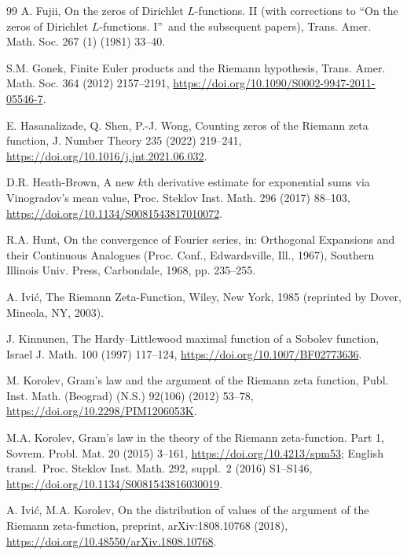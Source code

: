 \documentclass[preprint,12pt]{elsarticle}
\numberwithin{equation}{section}
\theoremstyle{plain}
\theoremstyle{definition}
\theoremstyle{remark}
\begin{document}
\begin{thebibliography}{99}
A. Fujii, On the zeros of Dirichlet $L$-functions. II (with corrections to ``On the zeros of Dirichlet $L$-functions. I\textquotedblright\ and the subsequent papers), Trans. Amer. Math. Soc. 267 (1) (1981) 33--40.

S.M. Gonek, Finite Euler products and the Riemann hypothesis, Trans. Amer. Math. Soc. 364 (2012) 2157--2191, \href{https://doi.org/10.1090/S0002-9947-2011-05546-7}{https://doi.org/10.1090/S0002-9947-2011-05546-7}.

E. Hasanalizade, Q. Shen, P.-J. Wong, Counting zeros of the Riemann zeta function, J. Number Theory 235 (2022) 219--241, \href{https://doi.org/10.1016/j.jnt.2021.06.032}{https://doi.org/10.1016/j.jnt.2021.06.032}.

D.R. Heath-Brown, A new $k$th derivative estimate for exponential sums via Vinogradov's mean value, Proc. Steklov Inst. Math. 296 (2017) 88--103, \href{https://doi.org/10.1134/S0081543817010072}{https://doi.org/10.1134/S0081543817010072}.

R.A. Hunt, On the convergence of Fourier series, in: Orthogonal Expansions and their Continuous Analogues (Proc. Conf., Edwardsville, Ill., 1967), Southern Illinois Univ. Press, Carbondale, 1968, pp. 235--255.

A. Ivi\'c, The Riemann Zeta-Function, Wiley, New York, 1985 (reprinted by Dover, Mineola, NY, 2003).

J. Kinnunen, The Hardy--Littlewood maximal function of a Sobolev function, Israel J. Math. 100 (1997) 117--124, \href{https://doi.org/10.1007/BF02773636}{https://doi.org/10.1007/BF02773636}.

M. Korolev, Gram's law and the argument of the Riemann zeta function, Publ. Inst. Math. (Beograd) (N.S.) 92(106) (2012) 53--78, \href{https://doi.org/10.2298/PIM1206053K}{https://doi.org/10.2298/PIM1206053K}.

M.A. Korolev, Gram\textquoteright s law in the theory of the Riemann zeta-function. Part 1, Sovrem. Probl. Mat. 20 (2015) 3--161, \href{https://doi.org/10.4213/spm53}{https://doi.org/10.4213/spm53}; English transl.\ Proc. Steklov Inst. Math. 292, suppl.~2 (2016) S1--S146, \href{https://doi.org/10.1134/S0081543816030019}{https://doi.org/10.1134/S0081543816030019}.

A. Ivi\'c, M.A. Korolev, On the distribution of values of the argument of the Riemann zeta-function, preprint, arXiv:1808.10768 (2018), \href{https://doi.org/10.48550/arXiv.1808.10768}{https://doi.org/10.48550/arXiv.1808.10768}.


\end{thebibliography}
\end{document}
